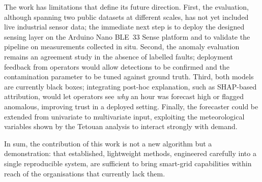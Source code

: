 \documentclass[conference]{IEEEtran}
\begin{document}
The work has limitations that define its future direction. First, the
evaluation, although spanning two public datasets at different scales, has not
yet included live industrial sensor data; the immediate next step is to deploy
the designed sensing layer on the Arduino Nano BLE~33 Sense platform and to
validate the pipeline on measurements collected in situ. Second, the anomaly
evaluation remains an agreement study in the absence of labelled faults;
deployment feedback from operators would allow detections to be confirmed and
the contamination parameter to be tuned against ground truth. Third, both
models are currently black boxes; integrating post-hoc explanation, such as
SHAP-based attribution, would let operators see \emph{why} an hour was
forecast high or flagged anomalous, improving trust in a deployed setting.
Finally, the forecaster could be extended from univariate to multivariate
input, exploiting the meteorological variables shown by the Tetouan analysis
to interact strongly with demand.
 
In sum, the contribution of this work is not a new algorithm but a
demonstration: that established, lightweight methods, engineered carefully
into a single reproducible system, are sufficient to bring smart-grid
capabilities within reach of the organisations that currently lack them.



\end{document}
